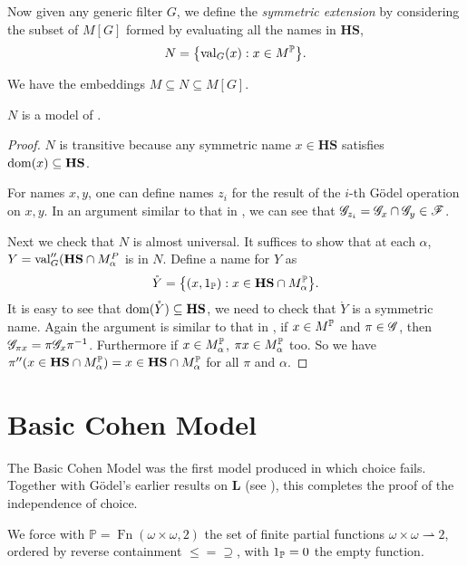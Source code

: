\begin{definition}
    Now given any generic filter \(G\), we define the \emph{symmetric extension}
    by considering the subset of \(M[G]\) formed by evaluating all the names in \(\mathbf{HS}\),
    \[ N = \set{ \val_G(x): x\in M^{\mathbb{P}} }. \]
\end{definition}
\begin{observation}
    We have the embeddings \(M \subseteq N \subseteq M[G]\).
\end{observation}

\begin{theorem}
    \(N\) is a model of \ZF.
\end{theorem}
\begin{proof}
    \(N\) is transitive because any symmetric name \(x\in \mathbf{HS}\) satisfies \(\dom(x)\subseteq \mathbf{HS}\).

    For names \(x,y\), one can define names \(z_i\) for the result of the \(i\)-th Gödel operation on \(x, y\).
    In an argument similar to that in , we can see that \(\G_{z_i} = \G_x \cap \G_y \in \mathscr{F}\).

    Next we check that \(N\) is almost universal.
    It suffices to show that at each \(\alpha\), \(Y = \val_G''(\mathbf{HS} \cap M^P_\alpha\) is in \(N\).
    Define a name for \(Y\) as
    \[ \mathring{Y} = \set{ (x,1_\P): x\in \mathbf{HS} \cap  M^\P_\alpha }. \]
    It is easy to see that \(\dom(\mathring{Y}) \subseteq \mathbf{HS}\), we need to check that \(\mathring{Y}\) is a symmetric name.
    Again the argument is similar to that in ,
    if \(x\in M^\P\) and \(\pi\in\G\), then \(\G_{\pi x} = \pi \G_x \pi^{-1}\).
    Furthermore if \(x\in M^\P_\alpha\), \(\pi x\in M^\P_\alpha\) too.
    So we have \(\pi''(x\in \mathbf{HS} \cap  M^\P_\alpha) = x\in \mathbf{HS} \cap  M^\P_\alpha \) for all \(\pi\) and \(\alpha\).
\end{proof}

\section{Basic Cohen Model}

The Basic Cohen Model was the first model produced in which choice fails.
Together with Gödel's earlier results on \(\mathbf{L}\) (see ),
this completes the proof of the independence of choice.

We force with \(\mathbb{P} = \operatorname{Fn}(\omega\times\omega, 2)\)
the set of finite partial functions \(\omega\times\omega \rightharpoonup 2\),
ordered by reverse containment \(\leq = \supseteq\),
with \(1_\P = 0\) the empty function.

